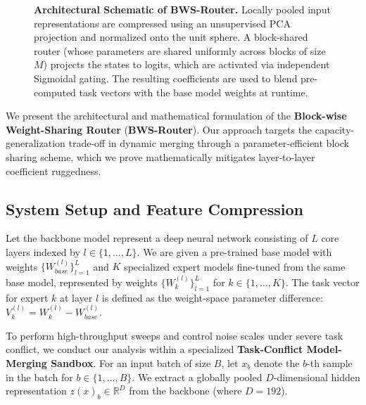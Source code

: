 \begin{figure}[t]
{
}
\caption{\textbf{Architectural Schematic of BWS-Router.} Locally pooled input representations are compressed using an unsupervised PCA projection and normalized onto the unit sphere. A block-shared router (whose parameters are shared uniformly across blocks of size $M$) projects the states to logits, which are activated via independent Sigmoidal gating. The resulting coefficients are used to blend pre-computed task vectors with the base model weights at runtime.}
\label{fig:schematic}
\end{figure}

We present the architectural and mathematical formulation of the \textbf{Block-wise Weight-Sharing Router} (\textbf{BWS-Router}). Our approach targets the capacity-generalization trade-off in dynamic merging through a parameter-efficient block sharing scheme, which we prove mathematically mitigates layer-to-layer coefficient ruggedness.

\subsection{System Setup and Feature Compression}
Let the backbone model represent a deep neural network consisting of $L$ core layers indexed by $l \in \{1, \dots, L\}$. We are given a pre-trained base model with weights $\{W_{base}^{(l)}\}_{l=1}^L$ and $K$ specialized expert models fine-tuned from the same base model, represented by weights $\{W_k^{(l)}\}_{l=1}^L$ for $k \in \{1, \dots, K\}$. The task vector for expert $k$ at layer $l$ is defined as the weight-space parameter difference: $V_k^{(l)} = W_k^{(l)} - W_{base}^{(l)}$.

To perform high-throughput sweeps and control noise scales under severe task conflict, we conduct our analysis within a specialized \textbf{Task-Conflict Model-Merging Sandbox}. For an input batch of size $B$, let $x_b$ denote the $b$-th sample in the batch for $b \in \{1, \dots, B\}$. We extract a globally pooled $D$-dimensional hidden representation $z(x)_b \in \mathbb{R}^D$ from the backbone (where $D = 192$).

